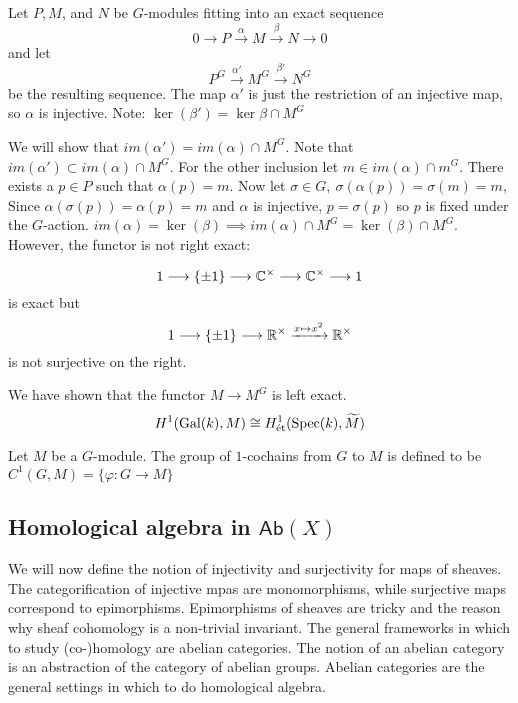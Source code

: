 Let $P, M$, and $N$ be $G$-modules fitting into an exact sequence 
\[
	0 \to P \xrightarrow{\alpha} M \xrightarrow{\beta} N \to 0
\]
and let 
\[
	P^G \xrightarrow{\alpha'} M^G \xrightarrow{\beta'} N^G
\]
be the resulting sequence. The map $\alpha'$ is just the restriction of an injective map, so $\alpha$ is injective. 
Note:
$\ker(\beta') = \ker \beta \cap M^G$

We will show that $im(\alpha') = im(\alpha) \cap M^G$.
Note that $im(\alpha') \subset im(\alpha) \cap M^G$. 
For the other inclusion let $m \in im(\alpha) \cap m^G$. There exists a $p \in P$ such that $\alpha(p)=m$. Now let $\sigma \in G,\ \sigma(\alpha(p)) = \sigma(m) = m$, 
Since $\alpha(\sigma(p)) = \alpha(p) = m$ and $\alpha$ is injective, $p = \sigma(p)$ so $p$ is fixed under the $G$-action. $im(\alpha) = \ker(\beta) \implies im(\alpha) \cap M^G = \ker(\beta) \cap M^G$. 
However, the functor is not right exact:
\begin{example}
	\[1 \longrightarrow \{\pm 1\} \longrightarrow \mathbb{C}^\times \longrightarrow \mathbb{C}^\times \longrightarrow 1\]
	is exact but 
	\[1 \longrightarrow\{\pm 1\} \longrightarrow \mathbb{R}^\times \xrightarrow{x \mapsto x^2} \mathbb{R}^\times\]
	is not surjective on the right.
\end{example}

We have shown that the functor $M \to M^G$ is left exact.
\[H^1(\operatorname{Gal}(k),M) \cong H_\text{\text{\'et}}^1(\operatorname{Spec}(k), \widetilde{M})\]

\begin{definition}
	Let $M$ be a $G$-module. The group of $1$-cochains from $G$ to $M$ is defined to be  $C^1(G, M) = \{\varphi: G \to M\}$
\end{definition}

	
\subsection{Homological algebra in $\mathsf{Ab}(X)$}

We will now define the notion of injectivity and surjectivity for maps of sheaves. The categorification of injective mpas are monomorphisms, while surjective maps correspond to epimorphisms. Epimorphisms of sheaves are tricky and the reason why sheaf cohomology is a non-trivial invariant. The general frameworks in which to study (co-)homology are abelian categories. The notion of an abelian category is an abstraction of the category of abelian groups. Abelian categories are the general settings in which to do homological algebra.

